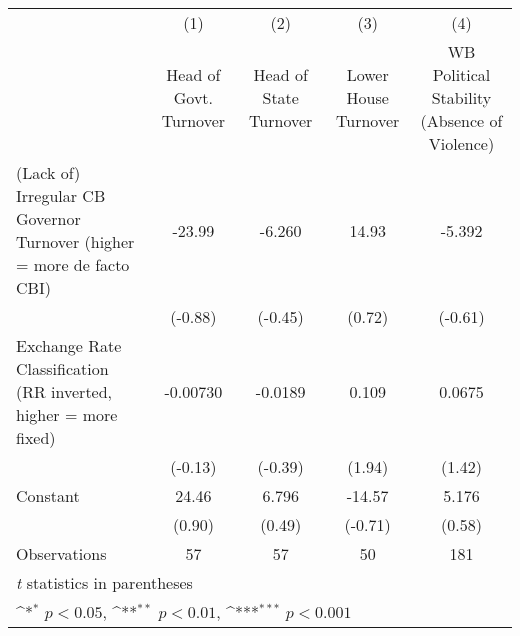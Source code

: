 {
\def\sym#1{\ifmmode^{#1}\else\(^{#1}\)\fi}
\begin{tabular}{l*{4}{c}}
\hline\hline
                &\multicolumn{1}{c}{(1)}&\multicolumn{1}{c}{(2)}&\multicolumn{1}{c}{(3)}&\multicolumn{1}{c}{(4)}\\
                &\multicolumn{1}{c}{Head of Govt. Turnover}&\multicolumn{1}{c}{Head of State Turnover}&\multicolumn{1}{c}{Lower House Turnover}&\multicolumn{1}{c}{WB Political Stability (Absence of Violence)}\\
\hline
(Lack of) Irregular CB Governor Turnover (higher = more de facto CBI)&   -23.99         &   -6.260         &    14.93         &   -5.392         \\
                &  (-0.88)         &  (-0.45)         &   (0.72)         &  (-0.61)         \\
[1em]
Exchange Rate Classification (RR inverted, higher = more fixed)& -0.00730         &  -0.0189         &    0.109         &   0.0675         \\
                &  (-0.13)         &  (-0.39)         &   (1.94)         &   (1.42)         \\
[1em]
Constant        &    24.46         &    6.796         &   -14.57         &    5.176         \\
                &   (0.90)         &   (0.49)         &  (-0.71)         &   (0.58)         \\
\hline
Observations    &       57         &       57         &       50         &      181         \\
\hline\hline
\multicolumn{5}{l}{\footnotesize \textit{t} statistics in parentheses}\\
\multicolumn{5}{l}{\footnotesize \sym{*} \(p<0.05\), \sym{**} \(p<0.01\), \sym{***} \(p<0.001\)}\\
\end{tabular}
}
